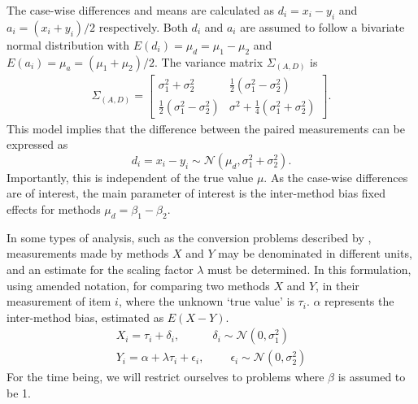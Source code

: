 \documentclass[12pt, a4paper]{report}
\theoremstyle{plain}
\theoremstyle{definition}
\theoremstyle{remark}
\begin{document}
The case-wise differences and means are calculated as $d_{i} =
x_{i}-y_{i}$ and $a_{i} = (x_{i}+y_{i})/2$  respectively. Both
$d_{i}$ and $a_{i}$ are assumed to follow a bivariate normal
distribution with $E(d_{i})= \mu_{d} = \mu_{1} - \mu_{2}$ and
$E(a_{i})= \mu_{a} = (\mu_{1} + \mu_{2})/2$. The variance matrix
$\Sigma_{(A,D)}$ is
\begin{eqnarray}
\Sigma_{(A,D)}= \left[\begin{matrix}
\sigma^{2}_{1}+\sigma^{2}_{2}&\frac{1}{2}(\sigma^{2}_{1}-\sigma^{2}_{2})\\
\frac{1}{2}(\sigma^{2}_{1}-\sigma^{2}_{2})&\sigma^{2}+
\frac{1}{4}(\sigma^{2}_{1}+\sigma^{2}_{2})
\end{matrix} \right].
\end{eqnarray}
This model implies that the difference between the paired measurements can be expressed as
\[ d_{i} = x_{i} - y_{i} \sim \mathcal{N} (\mu_d, \sigma^2_{1} + \sigma^2_{2}). \]
Importantly, this is independent of the true value $\mu$. As the case-wise differences are of interest, the main parameter of interest is the inter-method bias fixed effects for methods $\mu_d = \beta_1-\beta_2$.

%	

In some types of analysis, such as the conversion problems described by \citet{lewis}, measurements made by methods $X$ and $Y$ may be denominated in different units, and an estimate for the scaling factor $\lambda$ must be determined. In this formulation, using amended notation, for comparing two methods $X$ and $Y$, in their measurement of item $i$, where the unknown `true value' is $\tau_i$. $\alpha$ represents the inter-method bias, estimated as $E(X-Y)$. 
\begin{eqnarray}
X_i = \tau_i + \delta_i, \phantom{spacin} \delta_i \sim \mathcal{N}(0,\sigma^2_1)\\
Y_i = \alpha + \lambda \tau_i + \epsilon_i, \phantom{spaci}  \epsilon_i \sim \mathcal{N}(0,\sigma^2_2)
\end{eqnarray}
For the time being, we will restrict ourselves to problems where $\beta$ is assumed to be 1. 
  
\end{document}
